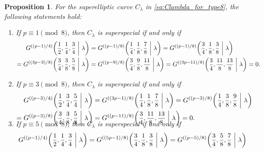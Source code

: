 \documentclass[10pt,a4paper]{amsart}
\newtheorem{Prop}[Def]{Proposition}
\begin{document}
\begin{Prop}\label{prop:gauss_for_type8}
For the superelliptic curve $C_\lambda$ in \eqref{eq:Clambda_for_type8}, the following statements hold:\vspace{-1.5mm}
\begin{enumerate}
\item[(1)] If $p \equiv 1 \pmod{8}$, then $C_\lambda$ is superspecial if and only if\vspace{-1.3mm}
\begin{align*}
    G^{((p-1)/4)}\scalebox{0.95}{$\displaystyle\left(\frac{1}{2},\frac{1}{4},\frac{3}{4}\ \middle|\ \lambda\right)$} &= G^{((p-1)/8)}\scalebox{0.95}{$\displaystyle\left(\frac{1}{4},\frac{1}{8},\frac{7}{8}\ \middle|\ \lambda\right)$} = G^{((p-1)/8)}\scalebox{0.95}{$\displaystyle\left(\frac{3}{4},\frac{1}{8},\frac{3}{8}\ \middle|\ \lambda\right)$}\\[-0.2mm]
    = G^{((3p-3)/8)}\scalebox{0.95}{$\displaystyle\left(\frac{3}{4},\frac{3}{8},\frac{5}{8}\ \middle|\ \lambda\right)$} &= G^{((p-9)/8)}\scalebox{0.95}{$\displaystyle\left(\frac{3}{4},\frac{9}{8},\frac{11}{8}\ \middle|\ \lambda\right)$} = G^{((3p-11)/8)}\scalebox{0.95}{$\displaystyle\left(\frac{3}{4},\frac{11}{8},\frac{13}{8}\ \middle|\ \lambda\right)$} = 0.
\end{align*}
\item[(2)] If $p \equiv 3 \pmod{8}$, then $C_\lambda$ is superspecial if and only if\vspace{-1mm}
\begin{align*}
    G^{((p-3)/4)}\scalebox{0.95}{$\displaystyle\left(\frac{1}{2},\frac{3}{4},\frac{5}{4}\ \middle|\ \lambda\right)$} &= G^{((3p-1)/8)}\scalebox{0.95}{$\displaystyle\left(\frac{1}{4},\frac{1}{8},\frac{7}{8}\ \middle|\ \lambda\right)$} = G^{((p-3)/8)}\scalebox{0.95}{$\displaystyle\left(\frac{1}{4},\frac{3}{8},\frac{9}{8}\ \middle|\ \lambda\right)$}\\[-0.2mm]
    = G^{((p-3)/8)}\scalebox{0.95}{$\displaystyle\left(\frac{3}{4},\frac{3}{8},\frac{5}{8}\ \middle|\ \lambda\right)$} &= G^{((p-11)/8)}\scalebox{0.95}{$\displaystyle\left(\frac{3}{4},\frac{11}{8},\frac{13}{8}\ \middle|\ \lambda\right)$} = 0.\\[-7.5mm]
\end{align*}
\item[(3)] If $p \equiv 5 \pmod{8}$, then $C_\lambda$ is superspecial if and only if\vspace{-1mm}
\begin{align*}
    G^{((p-1)/4)}\scalebox{0.95}{$\displaystyle\left(\frac{1}{2},\frac{1}{4},\frac{3}{4}\ \middle|\ \lambda\right)$} &= G^{((5p-1)/8)}\scalebox{0.95}{$\displaystyle\left(\frac{3}{4},\frac{1}{8},\frac{3}{8}\ \middle|\ \lambda\right)$} = G^{((p-5)/8)}\scalebox{0.95}{$\displaystyle\left(\frac{3}{4},\frac{5}{8},\frac{7}{8}\ \middle|\ \lambda\right)$}\\[-0.2mm]

\end{align*}
\end{enumerate}
\end{Prop}
\end{document}
